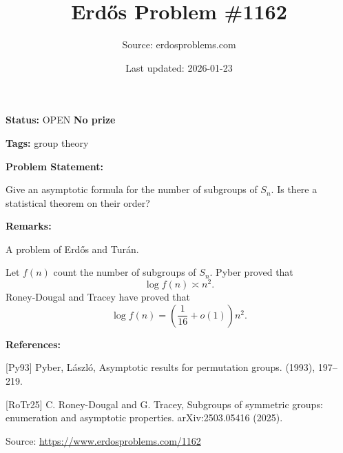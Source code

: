 \documentclass{article}
\title{Erd\H{o}s Problem \#1162}
\date{Last updated: 2026-01-23}
\author{Source: erdosproblems.com}
\begin{document}
\maketitle

\noindent\textbf{Status:} OPEN \quad \textbf{No prize}

\noindent\textbf{Tags:} group theory

\medskip
\noindent\textbf{Problem Statement:}

Give an asymptotic formula for the number of subgroups of $S_n$. Is there a statistical theorem on their order?

\bigskip
\noindent\textbf{Remarks:}

A problem of Erd\H{o}s and Tur\'{a}n.

Let $f(n)$ count the number of subgroups of $S_n$. Pyber \cite{Py93} proved that\[\log f(n) \asymp n^2.\]Roney-Dougal and Tracey \cite{RoTr25} have proved that\[\log f(n)=\left(\frac{1}{16}+o(1)\right)n^2.\]

\bigskip
\noindent\textbf{References:}

[Py93] Pyber, L\'{a}szl\'o, Asymptotic results for permutation groups. (1993), 197--219.
 
 [RoTr25] C. Roney-Dougal and G. Tracey, Subgroups of symmetric groups: enumeration and asymptotic properties. arXiv:2503.05416 (2025).

\bigskip
\noindent\small{Source: \url{https://www.erdosproblems.com/1162}}
\end{document}
